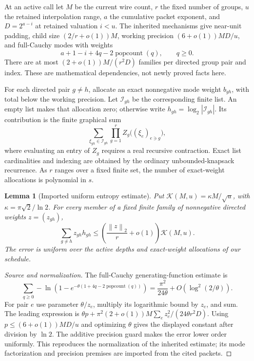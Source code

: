 \documentclass[11pt]{article}
\newtheorem{lemma}[theorem]{Lemma}
\theoremstyle{definition}\newtheorem{definition}[theorem]{Definition}
\theoremstyle{remark}\newtheorem{remark}[theorem]{Remark}
\newcommand{\K}{\mathcal K}
\newcommand{\pc}{\operatorname{popcount}}
\newcommand{\norm}[1]{\left\lVert#1\right\rVert_2}
\begin{document}
At an active call let $M$ be the current wire count, $r$ the fixed number
of groups, $u$ the retained interpolation range, $a$ the cumulative packet
exponent, and $D=2^{a-i}$ at retained valuation $i<u$. The inherited
mechanisms give near-unit padding, child size
$(2/r+o(1))M$, working precision $(6+o(1))MD/u$, and full-Cauchy modes with
weights
\[
 a+1-i+4q-2\pc(q),\qquad q\ge0.
\]
There are at most $(2+o(1))M/(r^2D)$ families per directed group pair and
index. These are mathematical dependencies, not newly proved facts here.

For each directed pair $g\ne h$, allocate an exact nonnegative mode weight
$b_{gh}$, with total below the working precision. Let $\mathcal I_{gh}$ be
the corresponding finite list. An empty list makes that allocation zero;
otherwise write $h_{gh}=\log_2|\mathcal I_{gh}|$. Its contribution is the
finite graphical sum
\begin{equation}\label{eq:graphsum}
 \sum_{\xi_{gh}\in\mathcal I_{gh}}
 \prod_{g=1}^r Z_g\bigl((\xi_e)_{e\ni g}\bigr),
\end{equation}
where evaluating an entry of $Z_g$ requires a real recursive contraction.
Exact list cardinalities and indexing are obtained by the ordinary
unbounded-knapsack recurrence. As $r$ ranges over a fixed finite set, the
number of exact-weight allocations is polynomial in $s$.

\begin{lemma}[Imported uniform entropy estimate]\label{lem:entropy}
Put $\K(M,u)=\kappa M/\sqrt u$, with $\kappa=\pi\sqrt2/\ln2$.
For every member of a fixed finite family of nonnegative directed weights
$z=(z_{gh})$,
\[
 \sum_{g\ne h}z_{gh}h_{gh}
 \le\left(\frac{\norm z}{r}+o(1)\right)\K(M,u).
\]
The error is uniform over the active depths and exact-weight allocations
of our schedule.
\end{lemma}
\begin{proof}[Source and normalization]
The full-Cauchy generating-function estimate is
\[
 \sum_{q\ge0}-\ln(1-e^{-\theta(1+4q-2\pc(q))})
 =\frac{\pi^2}{24\theta}+O(\log^2(2/\theta)).
\]
For pair $e$ use parameter $\theta/z_e$, multiply its logarithmic bound
by $z_e$, and sum. The leading expression is
$\theta p+\pi^2(2+o(1))M\sum_e z_e^2/(24\theta r^2D)$.
Using $p\le(6+o(1))MD/u$ and optimizing $\theta$ gives the displayed
constant after division by $\ln2$. The additive precision guard makes the
error lower order uniformly. This reproduces the normalization of the
inherited estimate; its mode factorization and precision premises are
imported from the cited packets.
\end{proof}
\end{document}
